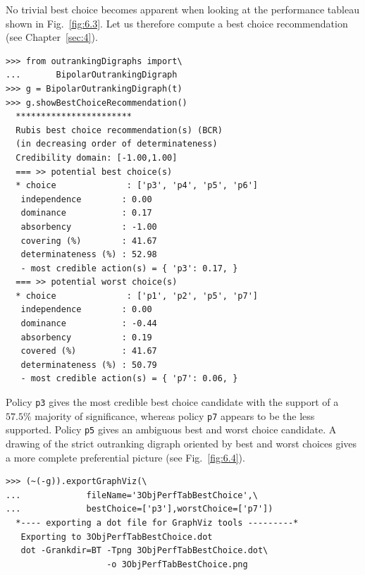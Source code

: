No trivial best choice becomes apparent when looking at the performance tableau shown in Fig.~\ref{fig:6.3}. Let us therefore compute a \Rubis best choice recommendation (see Chapter~\ref{sec:4}).
\begin{lstlisting}[caption={What is the public policy to recommend as best choice ?},label=list:6.4]
>>> from outrankingDigraphs import\
...       BipolarOutrankingDigraph
>>> g = BipolarOutrankingDigraph(t)
>>> g.showBestChoiceRecommendation()
  ***********************
  Rubis best choice recommendation(s) (BCR)
  (in decreasing order of determinateness)   
  Credibility domain: [-1.00,1.00]
  === >> potential best choice(s)
  * choice              : ['p3', 'p4', 'p5', 'p6']
   independence        : 0.00
   dominance           : 0.17
   absorbency          : -1.00
   covering (%)        : 41.67
   determinateness (%) : 52.98
   - most credible action(s) = { 'p3': 0.17, }
  === >> potential worst choice(s) 
  * choice              : ['p1', 'p2', 'p5', 'p7']
   independence        : 0.00
   dominance           : -0.44
   absorbency          : 0.19
   covered (%)         : 41.67
   determinateness (%) : 50.79
   - most credible action(s) = { 'p7': 0.06, }
\end{lstlisting}
Policy \texttt{p3} gives the most credible best choice candidate with the support of a $57.5\%$ majority of significance, whereas policy \texttt{p7} appears to be the less supported. Policy \texttt{p5} gives an ambiguous best and worst choice candidate. A drawing of the strict outranking digraph oriented by best and worst choices gives a more complete preferential picture (see Fig.~\ref{fig:6.4}).
\begin{lstlisting}
>>> (~(-g)).exportGraphViz(\
...             fileName='3ObjPerfTabBestChoice',\
...             bestChoice=['p3'],worstChoice=['p7'])
  *---- exporting a dot file for GraphViz tools ---------*
   Exporting to 3ObjPerfTabBestChoice.dot
   dot -Grankdir=BT -Tpng 3ObjPerfTabBestChoice.dot\
                    -o 3ObjPerfTabBestChoice.png
\end{lstlisting}
